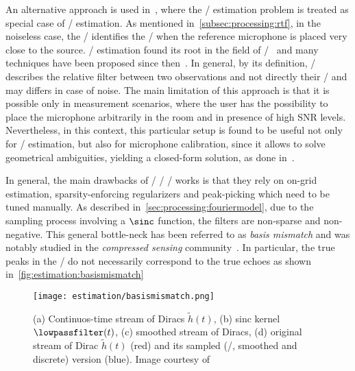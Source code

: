 \mynewline
An alternative approach is used in~, where the \RIR/ estimation problem is treated as special case of \RTF/ estimation.
As mentioned in~\cref{subsec:processing:rtf}, in the noiseless case, the \RTF/ identifies the \RIR/ when the reference microphone is placed very close to the source.
\RTF/ estimation found its root in the field of \SEdef/~ and many techniques have been proposed since then~.
In general, by its definition, \RTF/ describes the relative filter between two observations and not directly their \RIRs/ and may differs in case of noise.
The main limitation of this approach is that it is possible only in measurement scenarios, where the user has the possibility to place the microphone arbitrarily in the room and in presence of high SNR levels.
Nevertheless, in this context, this particular setup is found to be useful not only for \RTF/ estimation, but also for microphone calibration, since it allows to solve geometrical ambiguities, yielding a closed-form solution, as done in~.

\mynewline
In general, the main drawbacks of \FIR/ \SIMO/ \BCE/ works is that they rely on on-grid estimation, sparsity-enforcing regularizers and peak-picking which need to be tuned manually.
As described in~\cref{sec:processing:fouriermodel}, due to the sampling process involving a $\sinc$ function, the filters are non-sparse and non-negative.
This general bottle-neck has been referred to as \textit{basis mismatch} and was notably studied in the \textit{compressed sensing} community~.
In particular, the true peaks in the \RIR/ do not necessarily correspond to the true echoes as shown in~\cref{fig:estimation:basismismatch}
\begin{figure}[h]
    \begin{fullwidth}
        \centering
        \texttt{[image: estimation/basismismatch.png]}
        \caption{%
        (a) Continuos-time stream of Diracs $\tilde{h}(t)$,
        (b) sinc kernel $\lowpassfilter(t)$,
        (c) smoothed stream of Diracs,
        (d) original stream of Dirac $\tilde{h}(t)$ (red) and its sampled (\ie/, smoothed and discrete) version (blue).
        Image courtesy of~
        }
        \label{fig:estimation:mismatch}
    \end{fullwidth}
\end{figure}


